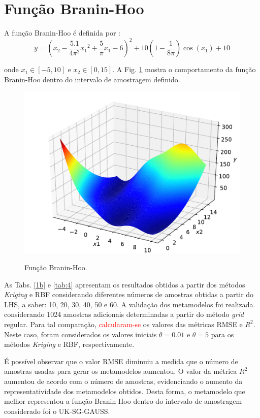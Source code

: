 \section{Função Branin-Hoo}

A função Branin-Hoo é definida por \cite{YIN2018}:
\begin{equation}
y = \left({x_2}-\frac{5.1} {4{\pi}^2}{x_1}^2+\frac{5} {\pi}{x_1}-6\right)^2+10 \left(1-\frac{1} {8\pi}\right)\cos({x_1})+10
\end{equation}

\noindent onde ${x_1} \in [-5,10]$ e ${x_2} \in [0,15]$. A Fig. \ref{fig:branin} mostra o comportamento da função Branin-Hoo dentro do intervalo de amostragem definido.

\begin{figure}[H]
	\centering
	{\includegraphics[width= 0.7\linewidth]{tatiane/fig_tati/branin/orig}}
	\caption{Função Branin-Hoo.} 
	\label{fig:branin}
\end{figure}

As Tabs. \ref{1b} e \ref{tab:4} apresentam os resultados obtidos a partir dos métodos {\it Kriging} e RBF considerando diferentes números de amostras obtidas a partir do LHS, a saber: 10, 20, 30, 40, 50 e 60. A validação dos metamodelos foi realizada considerando 1024 amostras adicionais determinadas a partir do método {\it grid} regular. Para tal comparação, \textcolor{red}{calcularam-se} os valores das métricas RMSE e ${R}^2$. Neste caso, foram considerados os valores iniciais $\theta=0.01$ e $\theta=5$ para os métodos {\it Kriging} e RBF, respectivamente. 

É possível observar que o valor RMSE diminuiu a medida que o número de amostras usadas para gerar os metamodelos aumentou. O valor da métrica $R^2$ aumentou de acordo com o número de amostras, evidenciando o aumento da representatividade dos metamodelos obtidos. Desta forma, o metamodelo que melhor representou a função Branin-Hoo dentro do intervalo de amostragem considerado foi o UK-SG-GAUSS.

